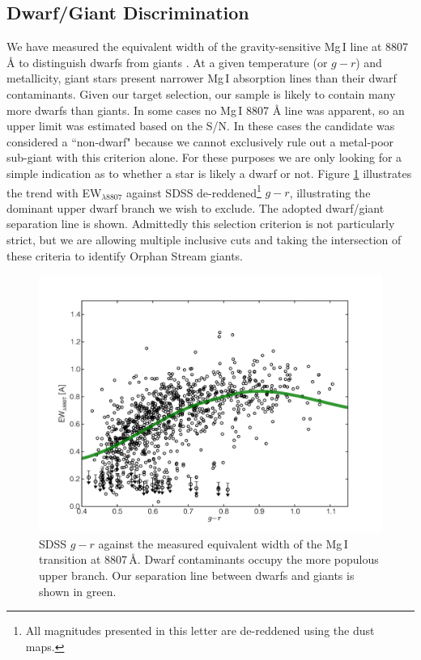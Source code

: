 \documentclass{emulateapj}
\begin{document}
\subsection{Dwarf/Giant Discrimination}
\label{sec:dwarf-giant}

We have measured the equivalent width of the gravity-sensitive Mg\,\textsc{I} line at 8807 \AA{} to distinguish dwarfs from giants \citep{Battaglia;Starkenburg_2012}. At a given temperature (or $g - r$) and metallicity, giant stars present narrower Mg\,\textsc{I} absorption lines than their dwarf contaminants. Given our target selection, our sample is likely to contain many more dwarfs than giants. In some cases no Mg\,\textsc{I} 8807 \AA{} line was apparent, so an upper limit was estimated based on the S/N. In these cases the candidate was considered a ``non-dwarf" because we cannot exclusively rule out a metal-poor sub-giant with this criterion alone. For these purposes we are only looking for a simple indication as to whether a star is likely a dwarf or not. Figure \ref{fig:ew-mg} illustrates the trend with EW$_{\lambda8807}$ against SDSS de-reddened\footnote{All magnitudes presented in this letter are de-reddened using the \citet{Schlegel;Finkbeiner;Davis_1998} dust maps.} $g - r$, illustrating the dominant upper dwarf branch we wish to exclude. The adopted dwarf/giant separation line is shown. Admittedly this selection criterion is not particularly strict, but we are allowing multiple inclusive cuts and taking the intersection of these criteria to identify Orphan Stream giants.

\begin{figure}[h]
	\includegraphics[width=\columnwidth]{./figures/ew-mg.pdf}
	\caption{SDSS $g - r$ against the measured equivalent width of the Mg\,\textsc{I} transition at 8807\,\AA{}. Dwarf contaminants occupy the more populous upper branch. Our separation line between dwarfs and giants is shown in green.}
	\label{fig:ew-mg}
\end{figure}
\end{document}
